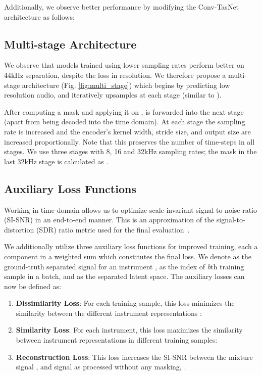 \documentclass{article}
\begin{document}
Additionally, we observe better performance by modifying the Conv-TasNet architecture as follows:

\subsection{Multi-stage Architecture}

We observe that models trained using lower sampling rates perform better on 44kHz separation, despite the loss in resolution.
We therefore propose a multi-stage architecture (Fig. \ref{fig:multi_stage})
which begins by predicting low resolution audio, and iteratively upsamples at each stage (similar to \cite{laplacian_pyramid_gan}).


After computing a mask  and applying it on ,  is forwarded into the next stage (apart from being decoded into the time domain). At each stage the sampling rate is increased and the encoder's kernel width, stride size, and output size are increased proportionally.
Note that this preserves the number of time-steps  in all stages. 
We use three stages with 8, 16 and 32kHz sampling rates; the mask in the last 32kHz stage is calculated as  .



\subsection{Auxiliary Loss Functions}

Working in time-domain allows us to optimize scale-invariant signal-to-noise ratio (SI-SNR) in an end-to-end manner.  This is an approximation of the signal-to-distortion (SDR) ratio metric used for the final evaluation~\cite{SiSEC18}.

We additionally utilize three  auxiliary loss functions for improved training, each a component in a weighted sum which constitutes the final loss. We denote  as the ground-truth separated signal for an instrument ,  as the index of \textit{b}th training sample in a batch, and  as the separated latent space. The auxiliary losses can now be defined as:   
\begin{enumerate}
    \item \textbf{Dissimilarity Loss}: For each training sample, this loss minimizes the similarity between the different instrument representations :
        
    \item \textbf{Similarity Loss}: For each instrument, this loss maximizes the similarity between instrument representations in different training samples:
        
    \item \textbf{Reconstruction Loss}: This loss increases the SI-SNR between the mixture signal , and signal as processed without any masking, .
\end{enumerate}
\end{document}

